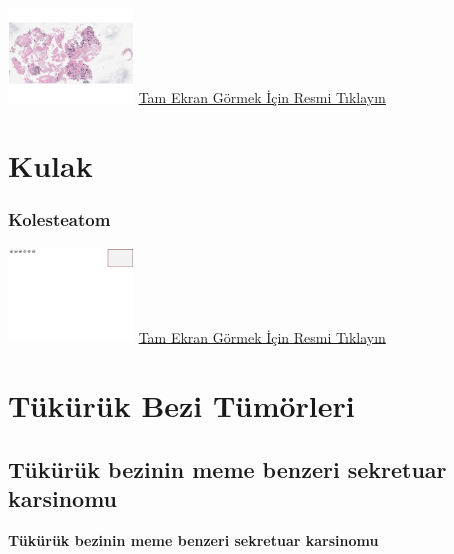 \documentclass[
  letterpaper,
  DIV=11,
  numbers=noendperiod]{scrreprt}
\begin{document}
\href{https://images.patolojiatlasi.com/nasopharynx-nonkeratinizing-scc/EBER.html}{\includegraphics[width=0.25\textwidth,height=\textheight]{./screenshots/nasopharynx-nonkeratinizing-scc-EBER_screenshot.png}}
\href{https://images.patolojiatlasi.com/nasopharynx-nonkeratinizing-scc/EBER.html}{Tam
Ekran Görmek İçin Resmi Tıklayın}

\hypertarget{sec-kulak}{%
\chapter{Kulak}\label{sec-kulak}}

\hypertarget{sec-kolesteatom}{%
\subsection{Kolesteatom}\label{sec-kolesteatom}}

\href{https://images.patolojiatlasi.com/template/HE.html}{\includegraphics[width=0.25\textwidth,height=\textheight]{./screenshots/template_screenshot.png}}
\href{https://images.patolojiatlasi.com/cholesteatoma/cholesteatoma.html}{Tam
Ekran Görmek İçin Resmi Tıklayın}

\hypertarget{sec-tukuruk-bezi-tumorleri}{%
\chapter{Tükürük Bezi Tümörleri}\label{sec-tukuruk-bezi-tumorleri}}

\hypertarget{tuxfckuxfcruxfck-bezinin-meme-benzeri-sekretuar-karsinomu}{%
\section{Tükürük bezinin meme benzeri sekretuar
karsinomu}\label{tuxfckuxfcruxfck-bezinin-meme-benzeri-sekretuar-karsinomu}}

\textbf{Tükürük bezinin meme benzeri sekretuar karsinomu}
\end{document}
